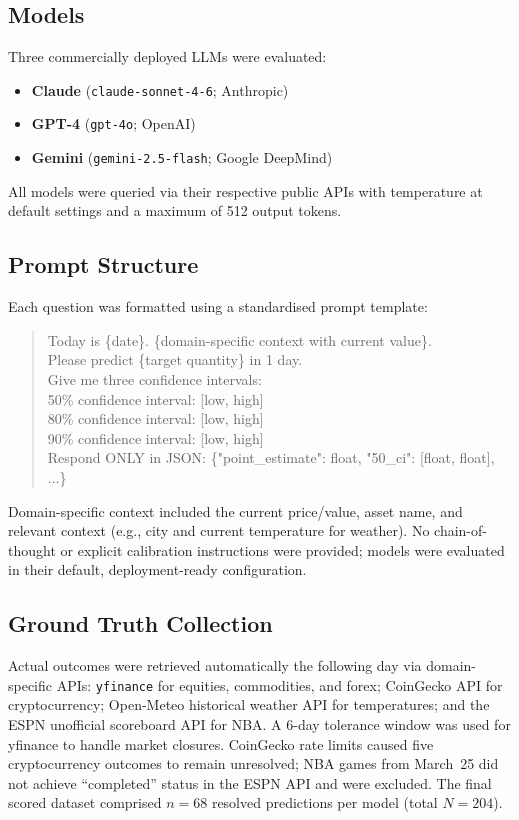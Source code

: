 \documentclass[9pt,twoside,lineno]{pnas-new}
\begin{document}
\subsection*{Models}

Three commercially deployed LLMs were evaluated:
\begin{itemize}
  \item \textbf{Claude} (\texttt{claude-sonnet-4-6}; Anthropic)
  \item \textbf{GPT-4} (\texttt{gpt-4o}; OpenAI)
  \item \textbf{Gemini} (\texttt{gemini-2.5-flash}; Google DeepMind)
\end{itemize}
All models were queried via their respective public APIs with temperature at default settings and a maximum of 512 output tokens.

\subsection*{Prompt Structure}

Each question was formatted using a standardised prompt template:

\begin{quote}
\small\ttfamily
Today is \{date\}. \{domain-specific context with current value\}. \\
Please predict \{target quantity\} in 1 day. \\
Give me three confidence intervals: \\
50\% confidence interval: [low, high] \\
80\% confidence interval: [low, high] \\
90\% confidence interval: [low, high] \\
Respond ONLY in JSON: \{"point\_estimate": float, "50\_ci": [float, float], ...\}
\end{quote}

Domain-specific context included the current price/value, asset name, and relevant context (e.g., city and current temperature for weather). No chain-of-thought or explicit calibration instructions were provided; models were evaluated in their default, deployment-ready configuration.

\subsection*{Ground Truth Collection}

Actual outcomes were retrieved automatically the following day via domain-specific APIs: \texttt{yfinance} for equities, commodities, and forex; CoinGecko API for cryptocurrency; Open-Meteo historical weather API for temperatures; and the ESPN unofficial scoreboard API for NBA. A 6-day tolerance window was used for yfinance to handle market closures. CoinGecko rate limits caused five cryptocurrency outcomes to remain unresolved; NBA games from March~25 did not achieve ``completed'' status in the ESPN API and were excluded. The final scored dataset comprised $n = 68$ resolved predictions per model (total $N = 204$).
\end{document}
